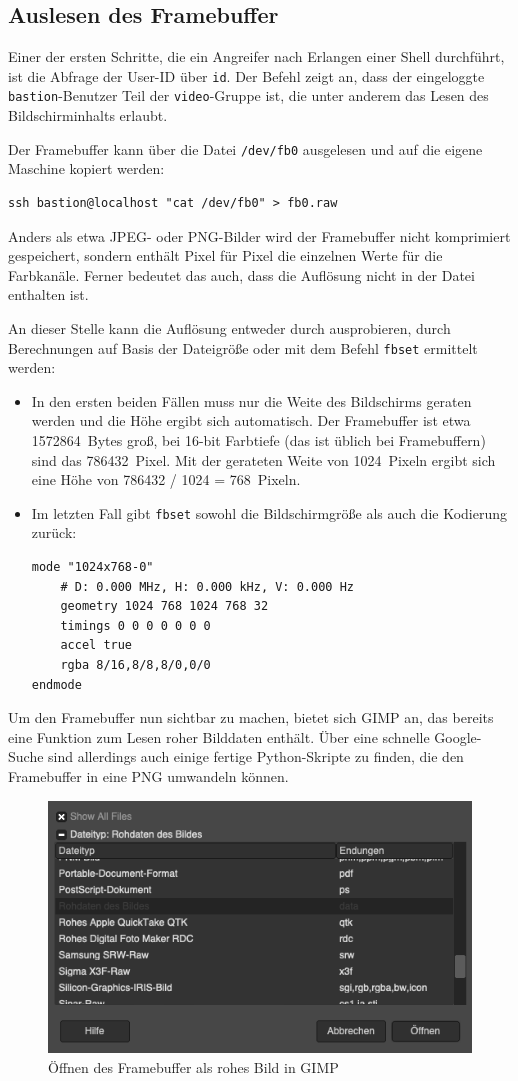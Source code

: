 \subsection{Auslesen des Framebuffer}
Einer der ersten Schritte, die ein Angreifer nach Erlangen einer Shell durchführt, ist die Abfrage der User-ID über \texttt{id}.
Der Befehl zeigt an, dass der eingeloggte \texttt{bastion}-Benutzer Teil der \texttt{video}-Gruppe ist, die unter anderem das Lesen des Bildschirminhalts erlaubt.

Der Framebuffer kann über die Datei \texttt{/dev/fb0} ausgelesen und auf die eigene Maschine kopiert werden:
\begin{lstlisting}
ssh bastion@localhost "cat /dev/fb0" > fb0.raw
\end{lstlisting}

Anders als etwa JPEG- oder PNG-Bilder wird der Framebuffer nicht komprimiert gespeichert, sondern enthält Pixel für Pixel die einzelnen Werte für die Farbkanäle.
Ferner bedeutet das auch, dass die Auflösung nicht in der Datei enthalten ist.

An dieser Stelle kann die Auflösung entweder durch ausprobieren, durch Berechnungen auf Basis der Dateigröße oder mit dem Befehl \texttt{fbset} ermittelt werden:
\begin{itemize}
\item In den ersten beiden Fällen muss nur die Weite des Bildschirms geraten werden und die Höhe ergibt sich automatisch. Der Framebuffer ist etwa 1572864~Bytes groß, bei 16-bit Farbtiefe (das ist üblich bei Framebuffern) sind das 786432~Pixel. Mit der gerateten Weite von 1024~Pixeln ergibt sich eine Höhe von 786432 / 1024 = 768~Pixeln.
\item Im letzten Fall gibt \texttt{fbset} sowohl die Bildschirmgröße als auch die Kodierung zurück:
\begin{lstlisting}
mode "1024x768-0"
	# D: 0.000 MHz, H: 0.000 kHz, V: 0.000 Hz
	geometry 1024 768 1024 768 32
	timings 0 0 0 0 0 0 0
	accel true
	rgba 8/16,8/8,8/0,0/0
endmode
\end{lstlisting}
\end{itemize}

Um den Framebuffer nun sichtbar zu machen, bietet sich GIMP an, das bereits eine Funktion zum Lesen roher Bilddaten enthält.
Über eine schnelle Google-Suche sind allerdings auch einige fertige Python-Skripte zu finden, die den Framebuffer in eine PNG umwandeln können.

\begin{figure}[!ht]
\centering
\includegraphics[width=.7\textwidth]{img/video_gimp_open.png}
\caption{Öffnen des Framebuffer als rohes Bild in GIMP}
\end{figure}

